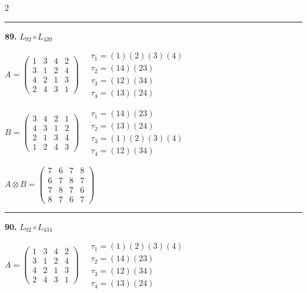 \begin{multicols}{2}
\vspace{0.3em}
\hrule
\vspace{0.3em}

\noindent\textbf{89.} $L_{92} \circ L_{420}$

$A = \begin{pmatrix} 1 & 3 & 4 & 2 \\ 3 & 1 & 2 & 4 \\ 4 & 2 & 1 & 3 \\ 2 & 4 & 3 & 1 \end{pmatrix} \quad \begin{matrix} \tau_{1}=(1)(2)(3)(4) \\ \tau_{2}=(1 4)(2 3) \\ \tau_{3}=(1 2)(3 4) \\ \tau_{4}=(1 3)(2 4) \end{matrix}$

$B = \begin{pmatrix} 3 & 4 & 2 & 1 \\ 4 & 3 & 1 & 2 \\ 2 & 1 & 3 & 4 \\ 1 & 2 & 4 & 3 \end{pmatrix} \quad \begin{matrix} \tau_{1}=(1 4)(2 3) \\ \tau_{2}=(1 3)(2 4) \\ \tau_{3}=(1)(2)(3)(4) \\ \tau_{4}=(1 2)(3 4) \end{matrix}$

$A \otimes B = \begin{pmatrix} 7 & 6 & 7 & 8 \\ 6 & 7 & 8 & 7 \\ 7 & 8 & 7 & 6 \\ 8 & 7 & 6 & 7 \end{pmatrix}$

\vspace{0.3em}
\hrule
\vspace{0.3em}

\noindent\textbf{90.} $L_{92} \circ L_{434}$

$A = \begin{pmatrix} 1 & 3 & 4 & 2 \\ 3 & 1 & 2 & 4 \\ 4 & 2 & 1 & 3 \\ 2 & 4 & 3 & 1 \end{pmatrix} \quad \begin{matrix} \tau_{1}=(1)(2)(3)(4) \\ \tau_{2}=(1 4)(2 3) \\ \tau_{3}=(1 2)(3 4) \\ \tau_{4}=(1 3)(2 4) \end{matrix}$


\end{multicols}

